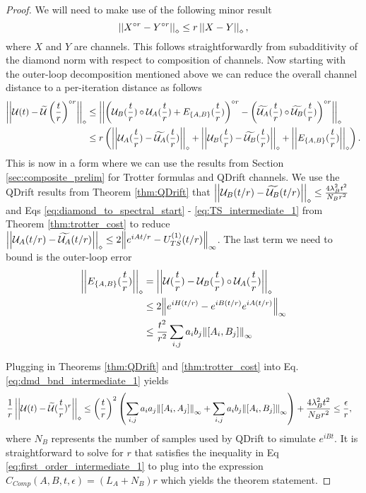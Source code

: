 \begin{proof}
We will need to make use of the following minor result 
\begin{equation}
    \left| \left| X^{\circ r} - Y^{\circ r} \right| \right|_\diamond \leq r \left| \left| X - Y \right| \right|_\diamond, \label{eq:err_to_err_per_iter}
\end{equation}
where $X$ and $Y$ are channels. This follows straightforwardly from subadditivity of the diamond norm with respect to composition of channels. Now starting with the outer-loop decomposition mentioned above we can reduce the overall channel distance to a per-iteration distance as follows
\begin{align}
    \left| \left| \mathcal{U}(t) - \widetilde{\mathcal{U}}\left( \frac{t}{r} \right)^{\circ r} \right| \right|_\diamond &\leq \left| \left| \left( \mathcal{U}_B(\frac{t}{r}) \circ \mathcal{U}_A(\frac{t}{r}) + E_{\left\{ A,B \right\}}(\frac{t}{r}) \right)^{\circ r} - \left( \widetilde{\mathcal{U}_A}(\frac{t}{r}) \circ \widetilde{\mathcal{U}_B}(\frac{t}{r}) \right)^{\circ r} \right| \right|_\diamond \\
    &\leq r \left(  \left| \left| \mathcal{U}_A(\frac{t}{r}) - \widetilde{\mathcal{U}_A}(\frac{t}{r}) \right| \right|_\diamond + \left| \left| \mathcal{U}_B(\frac{t}{r}) - \widetilde{\mathcal{U}_B}(\frac{t}{r}) \right| \right|_\diamond + \left| \left| E_{\left\{ A,B \right\}}(\frac{t}{r}) \right| \right|_\diamond  \right). \label{eq:dmd_bnd_intermediate_1}
\end{align}
This is now in a form where we can use the results from Section \ref{sec:composite_prelim} for Trotter formulas and QDrift channels. We use the QDrift results from Theorem \ref{thm:QDrift} that $\left| \left| \mathcal{U}_B(t/r) - \widetilde{\mathcal{U}_B}(t/r) \right| \right|_\diamond \leq \frac{4 \lambda_B^2 t^2}{N_B r^2}$ and Eqs \eqref{eq:diamond_to_spectral_start} - \eqref{eq:TS_intermediate_1} from Theorem \ref{thm:trotter_cost}  to reduce $\left| \left| \mathcal{U}_A(t/r) - \widetilde{\mathcal{U}_A}(t/r) \right| \right|_\diamond \leq 2 \norm{e^{iAt/r} - {U_{TS}^{( 1 )}}(t/r)}_{\infty}$. The last term we need to bound is the outer-loop error
\begin{align}
    \left| \left| E_{\left\{ A, B \right\}}(\frac{t}{r}) \right| \right|_\diamond &= \left| \left| \mathcal{U}(\frac{t}{r}) - \mathcal{U}_B(\frac{t}{r}) \circ \mathcal{U}_A(\frac{t}{r}) \right| \right|_\diamond \\
    &\leq 2 \norm{e^{i H (t/r)} - e^{i B (t/r)} e^{i A (t/r)}}_{\infty} \\
    &\leq \frac{t^2}{r^2} \sum_{i,j} a_i b_j \norm{[A_i, B_j]}_{\infty}
\end{align}

Plugging in Theorems \ref{thm:QDrift} and \ref{thm:trotter_cost} into Eq. \ref{eq:dmd_bnd_intermediate_1} yields
\begin{align}
    \frac{1}{r}\left| \left| \mathcal{U}(t) - \widetilde{\mathcal{U}}(\frac{t}{r})^r \right| \right|_\diamond &\leq \left( \frac{t}{r} \right)^2  \left( \sum_{i,j} a_i a_j \norm{[A_i, A_j]}_{\infty} + \sum_{i, j} a_i b_j \norm{[A_i, B_j]}_{\infty} \right) +  \frac{4 \lambda_B^2 t^2 }{N_B r^2} \leq \frac{\epsilon}{r}, \label{eq:first_order_intermediate_1}
\end{align}
where $N_B$ represents the number of samples used by QDrift to simulate $e^{iBt}$. It is straightforward to solve for $r$ that satisfies the inequality in Eq \eqref{eq:first_order_intermediate_1} to plug into the expression $C_{Comp}(A, B, t, \epsilon) = (L_A + N_B) r$ which yields the theorem statement. 
\end{proof}


